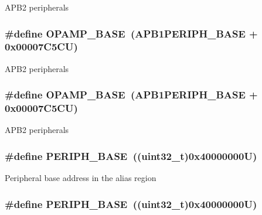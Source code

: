 A\-P\-B2 peripherals \hypertarget{group___peripheral__memory__map_ga6e9722d15c7ed794f0eca9682f64c03c}{
\subsubsection[{O\-P\-A\-M\-P\-\_\-\-B\-A\-S\-E}]{\setlength{\rightskip}{0pt plus 5cm}\#define O\-P\-A\-M\-P\-\_\-\-B\-A\-S\-E~(A\-P\-B1\-P\-E\-R\-I\-P\-H\-\_\-\-B\-A\-S\-E + 0x00007\-C5\-C\-U)}}\label{group___peripheral__memory__map_ga6e9722d15c7ed794f0eca9682f64c03c}
A\-P\-B2 peripherals \hypertarget{group___peripheral__memory__map_ga6e9722d15c7ed794f0eca9682f64c03c}{
\subsubsection[{O\-P\-A\-M\-P\-\_\-\-B\-A\-S\-E}]{\setlength{\rightskip}{0pt plus 5cm}\#define O\-P\-A\-M\-P\-\_\-\-B\-A\-S\-E~(A\-P\-B1\-P\-E\-R\-I\-P\-H\-\_\-\-B\-A\-S\-E + 0x00007\-C5\-C\-U)}}\label{group___peripheral__memory__map_ga6e9722d15c7ed794f0eca9682f64c03c}
A\-P\-B2 peripherals \hypertarget{group___peripheral__memory__map_ga9171f49478fa86d932f89e78e73b88b0}{
\subsubsection[{P\-E\-R\-I\-P\-H\-\_\-\-B\-A\-S\-E}]{\setlength{\rightskip}{0pt plus 5cm}\#define P\-E\-R\-I\-P\-H\-\_\-\-B\-A\-S\-E~((uint32\-\_\-t)0x40000000\-U)}}\label{group___peripheral__memory__map_ga9171f49478fa86d932f89e78e73b88b0}
Peripheral base address in the alias region \hypertarget{group___peripheral__memory__map_ga9171f49478fa86d932f89e78e73b88b0}{
\subsubsection[{P\-E\-R\-I\-P\-H\-\_\-\-B\-A\-S\-E}]{\setlength{\rightskip}{0pt plus 5cm}\#define P\-E\-R\-I\-P\-H\-\_\-\-B\-A\-S\-E~((uint32\-\_\-t)0x40000000\-U)}}\label{group___peripheral__memory__map_ga9171f49478fa86d932f89e78e73b88b0}
